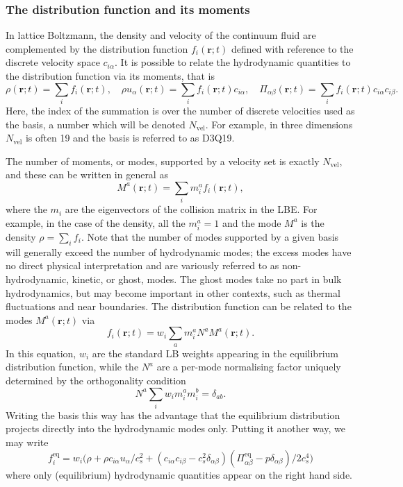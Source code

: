 \subsubsection{The distribution function and its moments}

In lattice Boltzmann, the density and velocity of the continuum fluid
are complemented by the  distribution function
$f_i(\mathbf{r}; t)$ defined with reference to the
discrete velocity space $c_{i\alpha}$.
It is possible to relate the hydrodynamic quantities to the distribution
function via its moments, that is
\begin{equation}
\rho(\mathbf{r};t) = \sum_i f_i(\mathbf{r};t),  \quad
\rho u_\alpha(\mathbf{r};t) = \sum_i f_i(\mathbf{r};t) c_{i\alpha},  \quad
\Pi_{\alpha\beta}(\mathbf{r};t) =
\sum_i f_i(\mathbf{r};t) c_{i\alpha} c_{i\beta}.
\label{equation-lb-f-moments}
\end{equation}
Here, the index of the summation is over the number of discrete
velocities used as the basis, a number which will be denoted
$N_\mathrm{vel}$. For example, in three dimensions
$N_\mathrm{vel}$ is often 19 and the basis is referred to as D3Q19.

The number of moments, or modes, supported by a velocity
set is exactly $N_\mathrm{vel}$, and these can be written in general as
\begin{equation}
M^a(\mathbf{r};t) = \sum_i m_i^a f_i(\mathbf{r};t),
\end{equation}
where the $m_i$ are the eigenvectors of the collision matrix in the LBE.
For example, in the case of the density, all the 
$m_i^a = 1$ and the mode $M^a$ is the density $\rho = \sum_i f_i$. Note
that the number of modes supported by a given basis will generally exceed the
number of hydrodynamic modes; the excess modes have no direct physical
interpretation and are variously referred to as non-hydrodynamic, kinetic,
or ghost, modes.
The ghost modes take no part in bulk hydrodynamics, but may become important
in other contexts, such as thermal fluctuations and near boundaries.
The distribution function can be related to the modes
$M^a(\mathbf{r};t)$ via
\begin{equation}
f_i(\mathbf{r};t) = w_i \sum_a m_i^a N^a M^a(\mathbf{r};t).
\end{equation}
In this equation, $w_i$ are the standard LB weights appearing in the
equilibrium distribution function, while the $N^a$ are a per-mode
normalising factor uniquely determined by the orthogonality condition
\begin{equation}
N^a \sum_i w_i m_i^a m_i^b = \delta_{ab}.
\end{equation}
Writing the basis this way has the advantage that the equilibrium
distribution projects directly into the hydrodynamic modes only.
Putting it another way, we may write
\begin{equation}
f_i^\mathrm{eq} = w_i \big(\rho + \rho c_{i\alpha}u_\alpha / c_s^2
+ (c_{i\alpha} c_{i\beta} - c_s^2\delta_{\alpha\beta})
(\Pi_{\alpha\beta}^\mathrm{eq} - p\delta_{\alpha\beta})/2c_s^4 \big)
\end{equation}
where only (equilibrium) hydrodynamic quantities appear on the right hand side.

